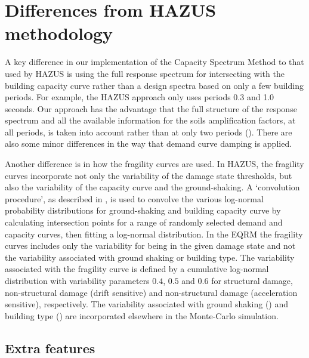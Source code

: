 \section{Differences from HAZUS methodology}


A key difference in our implementation of the Capacity Spectrum
Method to that used by HAZUS is
using the full response spectrum for intersecting with the
building capacity curve rather than a design
spectra based on only a few building periods. For example, the
HAZUS approach only uses periods 0.3 and 1.0 seconds. Our approach
has the advantage that the full structure of the response spectrum
and all the available information for the soils amplification
factors, at all periods, is taken into account rather than at only
two periods (). There are also some
minor differences in the way that demand curve damping is applied.

Another difference is in how the fragility curves are used. In HAZUS, the fragility curves incorporate not only the variability of the damage state
thresholds, but also the variability of the capacity
curve and the ground-shaking. A `convolution
procedure', as described in \cite{dr_Kircher97b}, is used to
convolve the various log-normal probability distributions for
ground-shaking and building capacity curve
by calculating intersection points for a range of randomly
selected demand and capacity curves, then
fitting a log-normal distribution. In the EQRM the fragility
curves includes only the variability for
being in the given damage state and not the variability associated
with ground shaking or building type. The
variability associated with the fragility curve is defined by a cumulative log-normal distribution with
variability parameters $0.4$, $0.5$ and $0.6$ for structural
damage, non-structural damage (drift sensitive) and non-structural
damage (acceleration sensitive), respectively. The variability
associated with ground shaking
() and building
type () are incorporated elsewhere in
the Monte-Carlo simulation.

\subsection{Extra features}

